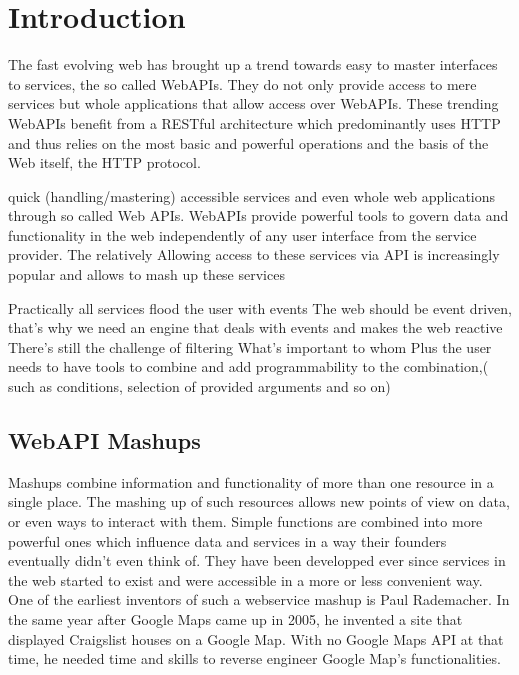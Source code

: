 \chapter{Introduction}

The fast evolving web has brought up a trend towards easy to master interfaces to services, the so called WebAPIs.
They do not only provide access to mere services but whole applications that allow access over WebAPIs.
These trending WebAPIs benefit from a RESTful architecture which predominantly uses HTTP and thus relies on the most basic and powerful operations and the basis of the Web itself, the HTTP protocol. 



quick (handling/mastering) accessible services and even whole web applications through so called Web APIs.
WebAPIs provide powerful tools to govern data and functionality in the web independently of any user interface from the service provider.
The relatively
Allowing access to these services via API is increasingly popular and allows to mash up these services

Practically all services flood the user with events
The web should be event driven, that's why we need an engine that deals with events and makes the web reactive
There's still the challenge of filtering
What's important to whom
Plus the user needs to have tools to combine and add programmability to the combination,( such as conditions, selection of provided arguments and so on)








\section{WebAPI Mashups}
Mashups combine information and functionality of more than one resource in a single place.
The mashing up of such resources allows new points of view on data, or even ways to interact with them.
Simple functions are combined into more powerful ones which influence data and services in a way their founders eventually didn't even think of.
They have been developped ever since services in the web started to exist and were accessible in a more or less convenient way.
One of the earliest inventors of such a webservice mashup is Paul Rademacher.
In the same year after Google Maps came up in 2005, he invented a site\cite{wwwRademacherOne,wwwRademacherTwo} that displayed Craigslist houses on a Google Map.
With no Google Maps API at that time, he needed time and skills to reverse engineer Google Map's functionalities.


